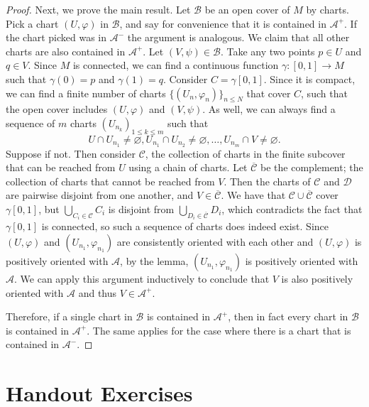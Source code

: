 \documentclass{article}
\theoremstyle{plain} %
\numberwithin{thm}{section} %
\theoremstyle{definition}
\begin{document}
\begin{proof}
            Next, we prove the main result. Let \(\mathcal{B}\) be an open cover of \(M\) by charts. Pick a chart \((U, \varphi)\) in \(\mathcal{B}\), and say for convenience that it is contained in \(\mathcal{A} ^+\). If the chart picked was in \(\mathcal{A} ^-\) the argument is analogous. We claim that all other charts are also contained in \(\mathcal{A} ^+\). Let \((V, \psi) \in \mathcal{B}\). Take any two points \(p \in U\) and \(q \in V\). Since \(M\) is connected, we can find a continuous function \(\gamma : [0,1] \to M\) such that \(\gamma (0) = p\) and \(\gamma (1) = q\). Consider \(C = \gamma [0,1]\). Since it is compact, we can find a finite number of charts \(\{ (U_n, \varphi_n) \} _{n \leq N}\) that cover \(C\), such that the open cover includes \((U, \varphi)\) and \((V, \psi)\). As well, we can always find a sequence of \(m\) charts \((U_{n_k})_{1 \leq k \leq m}\) such that
            \[
                U \cap U_{n_1} \neq \varnothing , U_{n_1} \cap U_{n_2} \neq \varnothing , \ldots , U_{n_{m}} \cap V \neq \varnothing.
            \]
            Suppose if not. Then consider \(\mathcal{C} \), the collection of charts in the finite subcover that can be reached from \(U\) using a chain of charts. Let \(\overline{\mathcal{C}}\) be the complement; the collection of charts that cannot be reached from \(V\). Then the charts of \(\mathcal{C}\) and \(\mathcal{D}\) are pairwise disjoint from one another, and \(V \in \overline{\mathcal{C}}\). We have that \(\mathcal{C} \cup \overline{\mathcal{C}}\) cover \(\gamma [0,1]\), but \(\bigcup_{C_i \in \mathcal{C}} C_i\) is disjoint from \(\bigcup_{D_i \in \overline{\mathcal{C}}} D_i\), which contradicts the fact that \(\gamma [0,1]\) is connected, so such a sequence of charts does indeed exist. Since \((U, \varphi)\) and \((U_{n_1}, \varphi_{n_1})\) are consistently oriented with each other and \((U, \varphi)\) is positively oriented with \(\mathcal{A}\), by the lemma, \((U_{n_1}, \varphi_{n_1})\) is positively oriented with \(\mathcal{A}\). We can apply this argument inductively to conclude that \(V\) is also positively oriented with \(\mathcal{A}\) and thus \(V \in \mathcal{A} ^+\).

            Therefore, if a single chart in \(\mathcal{B}\) is contained in \(\mathcal{A}^+\), then in fact every chart in \(\mathcal{B}\) is contained in \(\mathcal{A}^+\). The same applies for the case where there is a chart that is contained in \(\mathcal{A}^-\).
        \end{proof}
    \section{Handout Exercises}
\end{document}

